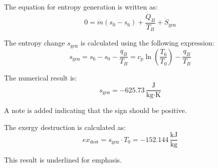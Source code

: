 The equation for entropy generation is written as:  
\[
0 = \dot{m} \left( s_0 - s_6 \right) + \frac{\dot{Q}_B}{T_B} + \dot{S}_{\text{gen}}
\]  

The entropy change \( s_{\text{gen}} \) is calculated using the following expression:  
\[
s_{\text{gen}} = s_6 - s_0 - \frac{q_B}{T_B} = c_p \ln \left( \frac{T_6}{T_0} \right) - \frac{q_B}{T_B}
\]  

The numerical result is:  
\[
s_{\text{gen}} = -625.73 \, \frac{\text{J}}{\text{kg·K}}
\]  

A note is added indicating that the sign should be positive.  

The exergy destruction is calculated as:  
\[
ex_{\text{dest}} = s_{\text{gen}} \cdot T_0 = -152.144 \, \frac{\text{kJ}}{\text{kg}}
\]  

This result is underlined for emphasis.